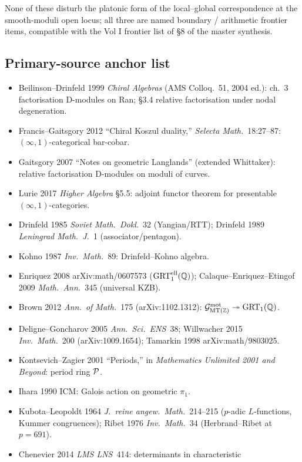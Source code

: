 None of these disturb the platonic form of the local--global
correspondence at the smooth-moduli open locus; all three are
named boundary / arithmetic frontier items, compatible with the Vol I
frontier list of §8 of the master synthesis.

\subsection*{Primary-source anchor list}

\begin{itemize}
\item Beilinson--Drinfeld 1999 \emph{Chiral Algebras} (AMS Colloq.\ 51,
2004 ed.): ch.~3 factorisation D-modules on Ran; \S3.4 relative
factorisation under nodal degeneration.
\item Francis--Gaitsgory 2012 ``Chiral Koszul duality,''
\emph{Selecta Math.}\ 18:27--87: $(\infty,1)$-categorical bar-cobar.
\item Gaitsgory 2007 ``Notes on geometric Langlands'' (extended
Whittaker): relative factorisation D-modules on moduli of curves.
\item Lurie 2017 \emph{Higher Algebra} §5.5: adjoint functor theorem
for presentable $(\infty,1)$-categories.
\item Drinfeld 1985 \emph{Soviet Math.\ Dokl.}\ 32 (Yangian/RTT);
Drinfeld 1989 \emph{Leningrad Math.\ J.}\ 1 (associator/pentagon).
\item Kohno 1987 \emph{Inv.\ Math.}\ 89: Drinfeld--Kohno algebra.
\item Enriquez 2008 arXiv:math/0607573 ($\mathrm{GRT}_1^{\mathrm{ell}}(\mathbb{Q})$);
Calaque--Enriquez--Etingof 2009 \emph{Math.\ Ann.}\ 345 (universal KZB).
\item Brown 2012 \emph{Ann.\ of Math.}\ 175 (arXiv:1102.1312):
$\mathcal{G}^{\mathrm{mot}}_{\mathrm{MT}(\mathbb{Z})} \twoheadrightarrow \mathrm{GRT}_1(\mathbb{Q})$.
\item Deligne--Goncharov 2005 \emph{Ann.\ Sci.\ ENS}\ 38; Willwacher
2015 \emph{Inv.\ Math.}\ 200 (arXiv:1009.1654); Tamarkin 1998
arXiv:math/9803025.
\item Kontsevich--Zagier 2001 ``Periods,'' in \emph{Mathematics
Unlimited 2001 and Beyond}: period ring $\mathcal{P}$.
\item Ihara 1990 ICM: Galois action on geometric $\pi_1$.
\item Kubota--Leopoldt 1964 \emph{J.\ reine angew.\ Math.}\ 214--215
($p$-adic $L$-functions, Kummer congruences); Ribet 1976 \emph{Inv.\
Math.}\ 34 (Herbrand--Ribet at $p = 691$).
\item Chenevier 2014 \emph{LMS LNS}\ 414: determinants in characteristic

\end{itemize}

